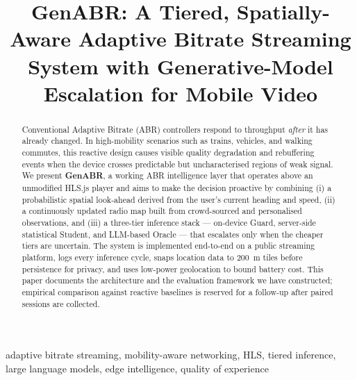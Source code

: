 \documentclass[conference]{IEEEtran}
\begin{document}
\title{GenABR: A Tiered, Spatially-Aware Adaptive Bitrate Streaming System with
       Generative-Model Escalation for Mobile Video}

\author{
}

\maketitle

\begin{abstract}
Conventional Adaptive Bitrate (ABR) controllers respond to throughput
\emph{after} it has already changed. In high-mobility scenarios such as
trains, vehicles, and walking commutes, this reactive design causes visible
quality degradation and rebuffering events when the device crosses
predictable but uncharacterised regions of weak signal. We present
\textbf{GenABR}, a working ABR intelligence layer that operates above an
unmodified HLS.js player and aims to make the decision proactive by
combining (i) a probabilistic spatial look-ahead derived from the user's
current heading and speed, (ii) a continuously updated radio map built from
crowd-sourced and personalised observations, and (iii) a three-tier
inference stack --- on-device Guard, server-side statistical Student, and
LLM-based Oracle --- that escalates only when the cheaper tiers are
uncertain. The system is implemented end-to-end on a public streaming
platform, logs every inference cycle, snaps location data to 200~m tiles
before persistence for privacy, and uses low-power geolocation to bound
battery cost. This paper documents the architecture and the evaluation
framework we have constructed; empirical comparison against reactive
baselines is reserved for a follow-up after paired sessions are collected.
\end{abstract}

\begin{IEEEkeywords}
adaptive bitrate streaming, mobility-aware networking, HLS, tiered
inference, large language models, edge intelligence, quality of experience
\end{IEEEkeywords}

\end{document}
